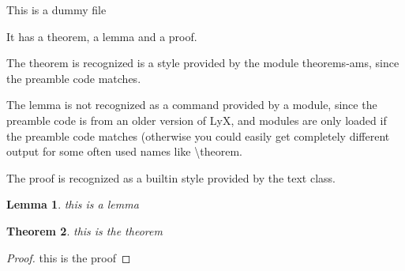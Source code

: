 \documentclass[oneside,english]{amsart}
\numberwithin{equation}{section} %
\numberwithin{figure}{section} %
\providecommand{\theoremname}{Theorem}
\theoremstyle{plain}
\newtheorem{thm}{\protect\theoremname}
\theoremstyle{plain}
\newtheorem{lem}[thm]{Lemma}
\begin{document}
This is a dummy file

It has a theorem, a lemma and a proof.

The theorem is recognized is a style provided by the module theorems-ams,
since the preamble code matches.

The lemma is not recognized as a command provided by a module, since the
preamble code is from an older version of LyX, and modules are only loaded
if the preamble code matches (otherwise you could easily get completely
different output for some often used names like \textbackslash theorem.

The proof is recognized as a builtin style provided by the text class.

\begin{lem}
this is a lemma\end{lem}
\begin{thm}
this is the theorem\end{thm}
\begin{proof}
this is the proof
\end{proof}
\end{document}
